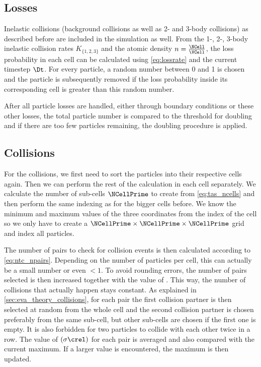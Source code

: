 \subsection{Losses}
Inelastic collisions (background collisions as well as 2- and 3-body collisions) as described before are included in the simulation as well. From the 1-, 2-, 3-body inelastic collision rates $K_{\{1,2,3\}}$ and the atomic density $n = \frac{\NCell}{\VCell}$, the loss probability in each cell can be calculated using \cref{eq:lossrate} and the current timestep $\Dt$.
For every particle, a random number between 0 and 1 is chosen and the particle is subsequently removed if the loss probability inside its corresponding cell is greater than this random number.

After all particle losses are handled, either through boundary conditions or these other losses, the total particle number is compared to the threshold for doubling and if there are too few particles remaining, the doubling procedure is applied.

\subsection{Collisions}
For the collisions, we first need to sort the particles into their respective cells again. Then we can perform the rest of the calculation in each cell separately.
We calculate the number of sub-cells $\NCellPrime$ to create from \cref{eq:tas_ncells} and then perform the same indexing as for the bigger cells before. We know the minimum and maximum values of the three coordinates from the index of the cell so we only have to create a $\NCellPrime \times \NCellPrime \times \NCellPrime$ grid and index all particles.

The number of pairs to check for collision events is then calculated according to \cref{eq:ntc_npairs}. Depending on the number of particles per cell, this can actually be a small number or even $< 1$. To avoid rounding errors, the number of pairs selected is then increased together with the value of \maxProb. This way, the number of collisions that actually happen stays constant. As explained in \cref{sec:eva_theory_collisions}, for each pair the first collision partner is then selected at random from the whole cell and the second collision partner is chosen preferably from the same sub-cell, but other sub-cells are chosen if the first one is empty. It is also forbidden for two particles to collide with each other twice in a row. The value of $(\sigma \crel)$ for each pair is averaged and also compared with the current maximum. If a larger value is encountered, the maximum is then updated.

